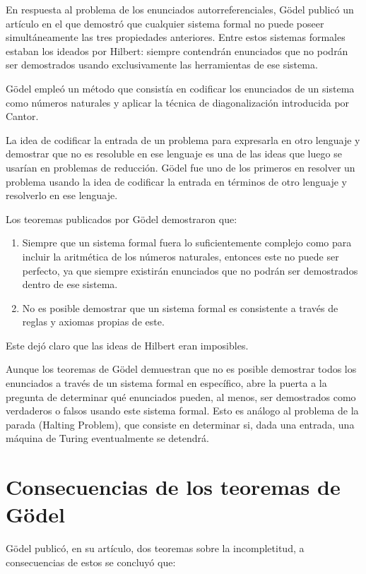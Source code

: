 \documentclass[14pt]{extarticle}
\begin{document}
En respuesta al problema de los enunciados autorreferenciales, Gödel publicó un artículo en el que demostró que cualquier sistema formal no puede poseer simultáneamente las tres propiedades anteriores.  Entre estos sistemas formales estaban los ideados por Hilbert: siempre contendrán enunciados que no podrán ser demostrados usando exclusivamente las herramientas de ese sistema.

Gödel empleó un método que consistía en codificar los enunciados de un sistema como números naturales y aplicar la técnica de diagonalización introducida por Cantor. 

La idea de codificar la entrada de un problema para expresarla en otro lenguaje y demostrar que no es resoluble en ese lenguaje es una de las ideas que luego se usarían en problemas de reducción. Gödel fue uno de los primeros en resolver un problema usando la idea de codificar la entrada en términos de otro lenguaje y resolverlo en ese lenguaje.

Los teoremas publicados por Gödel demostraron que: 

\begin{enumerate}
    \item Siempre que un sistema formal fuera lo suficientemente complejo como para incluir la aritmética de los números naturales, entonces este no puede ser perfecto, ya que siempre existirán enunciados que no podrán ser demostrados dentro de ese sistema.
    \item No es posible demostrar que un sistema formal es consistente a través de reglas y axiomas propias de este.  
\end{enumerate}

Este dejó claro que las ideas de Hilbert eran imposibles. \cite{godel}

Aunque los teoremas de Gödel demuestran que no es posible demostrar todos los enunciados a través de un sistema formal en específico, abre la puerta a la pregunta de determinar qué enunciados pueden, al menos, ser demostrados como verdaderos o falsos usando este sistema formal. Esto es análogo al problema de la parada (Halting Problem), que consiste en determinar si, dada una entrada, una máquina de Turing eventualmente se detendrá.


\section{Consecuencias de los teoremas de Gödel}

Gödel publicó, en su artículo, dos teoremas sobre la incompletitud, a consecuencias de estos se concluyó que:
\end{document}

